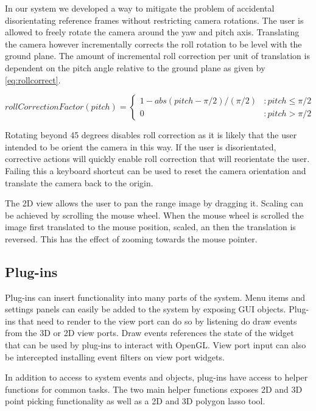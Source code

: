 In our system we developed a way to mitigate the problem of accidental disorientating reference frames without restricting camera rotations. The user is allowed to freely rotate the camera around the yaw and pitch axis. Translating the camera however incrementally corrects the roll rotation to be level with the ground plane. The amount of incremental roll correction per unit of translation is dependent on the pitch angle relative to the ground plane as given by \autoref{eq:rollcorrect}.

\begin{equation} \label{eq:rollcorrect}
   rollCorrectionFactor(pitch) = \left\{
     \begin{array}{lr}
       1 - abs(pitch-\pi/2)/(\pi/2) & : pitch \le \pi/2\\
       0 & : pitch  > \pi/2
     \end{array}
   \right.
\end{equation}

Rotating beyond 45 degrees disables roll correction as it is likely that the user intended to be orient the camera in this way. If the user is disorientated, corrective actions will quickly enable roll correction that will reorientate the user. Failing this a keyboard shortcut can be used to reset the camera orientation and translate the camera back to the origin.

The 2D view allows the user to pan the range image by dragging it. Scaling can be achieved by scrolling the mouse wheel. When the mouse wheel is scrolled the image first translated to the mouse position, scaled, an then the translation is reversed. This has the effect of zooming towards the mouse pointer.


\subsection{Plug-ins}
Plug-ins can insert functionality into many parts of the system. Menu items and settings panels can easily be added to the system by exposing GUI objects. Plug-ins that need to render to the view port can do so by listening do draw events from the 3D or 2D view ports. Draw events references the state of the widget that can be used by plug-ins to interact with OpenGL. View port input can also be intercepted installing event filters on view port widgets.

In addition to access to system events and objects, plug-ins have access to helper functions for common tasks. The two main helper functions exposes 2D and 3D point picking functionality as well as a 2D and 3D polygon lasso tool.

